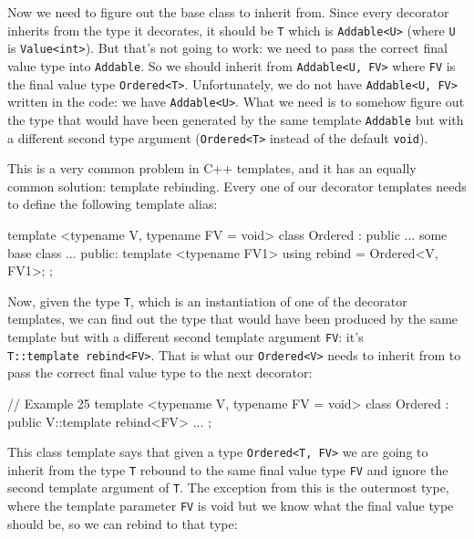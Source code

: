 Now we need to figure out the base class to inherit from. Since every decorator inherits from the type it decorates, it should be \texttt{T} which is \texttt{Addable\textless{}U\textgreater{}} (where \texttt{U} is \texttt{Value\textless{}int\textgreater{}}). But that's not going to work: we need to pass the correct final value type into \texttt{Addable}. So we should inherit from \texttt{Addable\textless{}U,\ FV\textgreater{}} where \texttt{FV} is the final value type \texttt{Ordered\textless{}T\textgreater{}}. Unfortunately, we do not have \texttt{Addable\textless{}U,\ FV\textgreater{}} written in the code: we have \texttt{Addable\textless{}U\textgreater{}}. What we need is to somehow figure out the type that would have been generated by the same template \texttt{Addable} but with a different second type argument (\texttt{Ordered\textless{}T\textgreater{}} instead of the default \texttt{void}).

This is a very common problem in C++ templates, and it has an equally common solution: template rebinding. Every one of our decorator templates needs to define the following template alias:

\begin{code}
template <typename V, typename FV = void>
class Ordered : public ... some base class ... {
  public:
  template <typename FV1> using rebind = Ordered<V, FV1>;
};
\end{code}

Now, given the type \texttt{T}, which is an instantiation of one of the decorator templates, we can find out the type that would have been produced by the same template but with a different second template argument \texttt{FV}: it's \texttt{T::template\ rebind\textless{}FV\textgreater{}}. That is what our \texttt{Ordered\textless{}V\textgreater{}} needs to inherit from to pass the correct final value type to the next decorator:

\begin{code}
// Example 25
template <typename V, typename FV = void>
class Ordered : public V::template rebind<FV> { ... };
\end{code}

This class template says that given a type \texttt{Ordered\textless{}T,\ FV\textgreater{}} we are going to inherit from the type \texttt{T} rebound to the same final value type \texttt{FV} and ignore the second template argument of \texttt{T}. The exception from this is the outermost type, where the template parameter \texttt{FV} is void but we know what the final value type should be, so we can rebind to that type:

